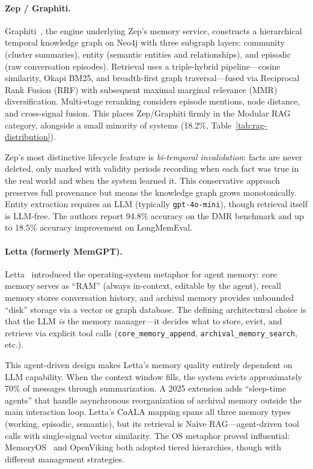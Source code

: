 \paragraph{Zep / Graphiti.}
Graphiti~\cite{dempsey2025graphiti}, the engine underlying Zep's memory
service, constructs a hierarchical temporal knowledge graph on Neo4j
with three subgraph layers: community (cluster summaries), entity
(semantic entities and relationships), and episodic (raw conversation
episodes). Retrieval uses a triple-hybrid pipeline---cosine similarity,
Okapi BM25, and breadth-first graph traversal---fused via Reciprocal
Rank Fusion (RRF) with subsequent maximal marginal relevance (MMR)
diversification. Multi-stage reranking considers episode mentions, node
distance, and cross-signal fusion. This places Zep/Graphiti firmly in
the Modular RAG category, alongside a small minority of systems
(18.2\%, Table~\ref{tab:rag-distribution}).

Zep's most distinctive lifecycle feature is \emph{bi-temporal
invalidation}: facts are never deleted, only marked with validity
periods recording when each fact was true in the real world and when
the system learned it. This conservative approach preserves full
provenance but means the knowledge graph grows monotonically. Entity
extraction requires an LLM (typically \texttt{gpt-4o-mini}), though
retrieval itself is LLM-free. The authors report 94.8\% accuracy on
the DMR benchmark and up to 18.5\% accuracy improvement on
LongMemEval.

\paragraph{Letta (formerly MemGPT).}
Letta~\cite{packer2023memgpt} introduced the operating-system metaphor
for agent memory: core memory serves as ``RAM'' (always in-context,
editable by the agent), recall memory stores conversation history, and
archival memory provides unbounded ``disk'' storage via a vector or
graph database. The defining architectural choice is that the LLM
\emph{is} the memory manager---it decides what to store, evict, and
retrieve via explicit tool calls (\texttt{core\_memory\_append},
\texttt{archival\_memory\_search}, etc.).

This agent-driven design makes Letta's memory quality entirely
dependent on LLM capability. When the context window fills, the
system evicts approximately 70\% of messages through summarization.
A 2025 extension adds ``sleep-time agents'' that handle asynchronous
reorganization of archival memory outside the main interaction loop.
Letta's CoALA mapping spans all three memory types (working, episodic,
semantic), but its retrieval is Naive RAG---agent-driven tool calls
with single-signal vector similarity. The OS metaphor proved
influential: MemoryOS~\cite{kang2025memoryos} and OpenViking both
adopted tiered hierarchies, though with different management
strategies.

